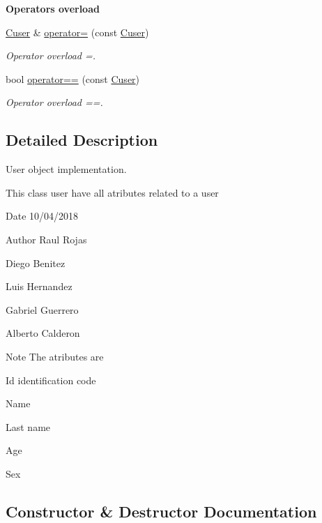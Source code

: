 \begin{Indent}{\bf Operator\textquotesingle{}s overload}\par
\begin{DoxyCompactItemize}
\item 
\hyperlink{class_cuser}{Cuser} \& \hyperlink{class_cuser_aef852c28290d89b9b5ce337e2efc8402}{operator=} (const \hyperlink{class_cuser}{Cuser})
\begin{DoxyCompactList}\small\item\em Operator overload =. \end{DoxyCompactList}\item 
bool \hyperlink{class_cuser_aef7e5bb5e3100340f137c9d4e737303f}{operator==} (const \hyperlink{class_cuser}{Cuser})
\begin{DoxyCompactList}\small\item\em Operator overload ==. \end{DoxyCompactList}\end{DoxyCompactItemize}
\end{Indent}


\subsection{Detailed Description}
User object implementation. 

This class user have all atributes related to a user \begin{DoxyDate}{Date}
10/04/2018 
\end{DoxyDate}
\begin{DoxyAuthor}{Author}
Raul Rojas  

Diego Benitez  

Luis Hernandez  

Gabriel Guerrero  

Alberto Calderon  
\end{DoxyAuthor}
\begin{DoxyNote}{Note}
The atributes are
\end{DoxyNote}

\begin{DoxyItemize}
\item Id identification code
\item Name
\item Last name
\item Age
\item Sex 
\end{DoxyItemize}

\subsection{Constructor \& Destructor Documentation}
